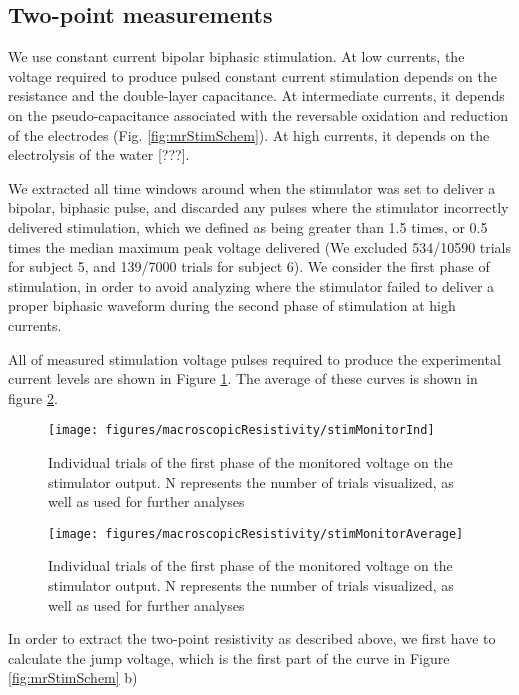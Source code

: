 \subsection{Two-point measurements}

We use constant current bipolar biphasic stimulation. At low currents, the voltage required to produce pulsed constant current stimulation depends on the resistance and the double-layer capacitance. At intermediate currents, it depends on the pseudo-capacitance associated with the reversable oxidation and reduction of the electrodes (Fig. \ref{fig:mrStimSchem}). At high currents, it depends on the electrolysis of the water [???].

We extracted all time windows around when the stimulator was set to deliver a bipolar, biphasic pulse, and discarded any pulses where the stimulator incorrectly delivered stimulation, which we defined as being greater than 1.5 times, or 0.5 times the median maximum peak voltage delivered (We excluded 534/10590 trials for subject 5, and 139/7000 trials for subject 6). We consider the first phase of stimulation, in order to avoid analyzing where the stimulator failed to deliver a proper biphasic waveform during the second phase of stimulation at high currents. 

All of measured stimulation voltage pulses required to produce the experimental current levels are shown in Figure \ref{fig:mrStimMonInd}. The average of these curves is shown in figure \ref{fig:mrStimMonAverage}.
	
	\begin{figure}[ht]
		\centering
		\texttt{[image: figures/macroscopicResistivity/stimMonitorInd]}
		\caption[Individual stimulation monitor output]{Individual trials of the first phase of the monitored voltage on the stimulator output. N represents the number of trials visualized, as well as used for further analyses}
		\label{fig:mrStimMonInd}
	\end{figure}
	

\begin{figure}[ht]
	\centering
	\texttt{[image: figures/macroscopicResistivity/stimMonitorAverage]}
	\caption[Average stimulation monitor output]{Individual trials of the first phase of the monitored voltage on the stimulator output. N represents the number of trials visualized, as well as used for further analyses}
	\label{fig:mrStimMonAverage}
\end{figure}

In order to extract the two-point resistivity as described above, we first have to calculate the jump voltage, which is the first part of the curve in Figure \ref{fig:mrStimSchem} b)

